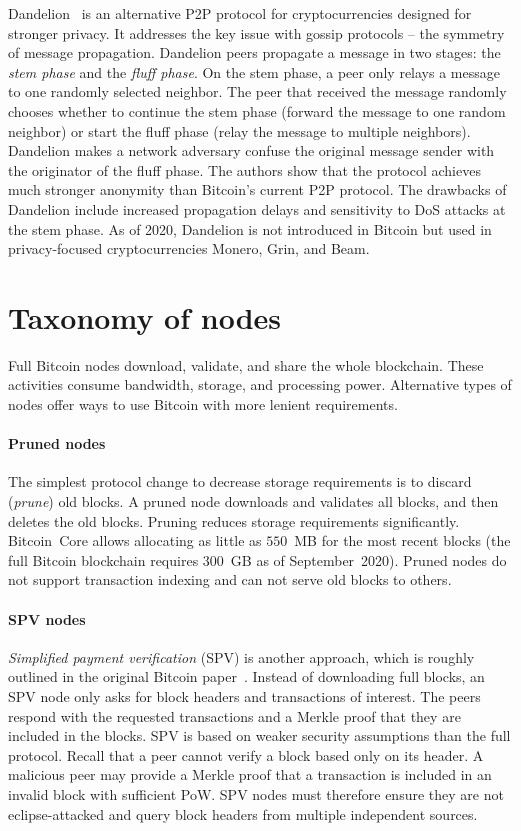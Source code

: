 Dandelion~\cite{Venkatakrishnan2017, Fanti2018} is an alternative P2P protocol for cryptocurrencies designed for stronger privacy.
It addresses the key issue with gossip protocols -- the symmetry of message propagation.
Dandelion peers propagate a message in two stages: the \textit{stem phase} and the \textit{fluff phase}.
On the stem phase, a peer only relays a message to one randomly selected neighbor.
The peer that received the message randomly chooses whether to continue the stem phase (forward the message to one random neighbor) or start the fluff phase (relay the message to multiple neighbors).
Dandelion makes a network adversary confuse the original message sender with the originator of the fluff phase.
The authors show that the protocol achieves much stronger anonymity than Bitcoin's current P2P protocol.
The drawbacks of Dandelion include increased propagation delays and sensitivity to DoS attacks at the stem phase.
As of 2020, Dandelion is not introduced in Bitcoin but used in privacy-focused cryptocurrencies Monero, Grin, and Beam.


\section{Taxonomy of nodes}
\label{sec:TaxonomyOfNodes}

Full Bitcoin nodes download, validate, and share the whole blockchain.
These activities consume bandwidth, storage, and processing power.
Alternative types of nodes offer ways to use Bitcoin with more lenient requirements.

\paragraph{Pruned nodes}
The simplest protocol change to decrease storage requirements is to discard (\textit{prune}) old blocks.
A pruned node downloads and validates all blocks, and then deletes the old blocks.
Pruning reduces storage requirements significantly.
Bitcoin~Core allows allocating as little as $550$~MB for the most recent blocks (the full Bitcoin blockchain requires $300$~GB as of September~2020).
Pruned nodes do not support transaction indexing and can not serve old blocks to others.

\paragraph{SPV nodes}
\textit{Simplified payment verification} (SPV) is another approach, which is roughly outlined in the original Bitcoin paper~\cite{Nakamoto2008}.
Instead of downloading full blocks, an SPV node only asks for block headers and transactions of interest.
The peers respond with the requested transactions and a Merkle proof that they are included in the blocks.
SPV is based on weaker security assumptions than the full protocol.
Recall that a peer cannot verify a block based only on its header.
A malicious peer may provide a Merkle proof that a transaction is included in an invalid block with sufficient PoW.
SPV nodes must therefore ensure they are not eclipse-attacked and query block headers from multiple independent sources.

